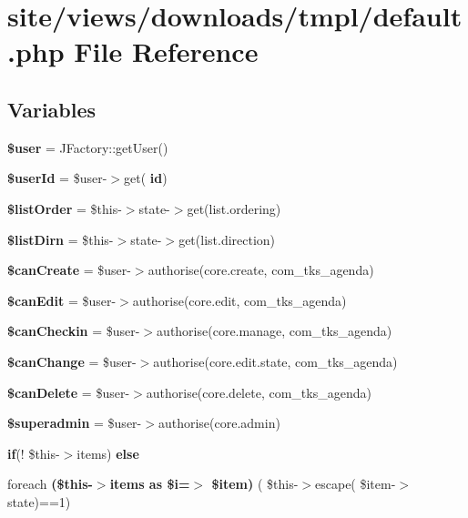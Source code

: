 \section{site/views/downloads/tmpl/default.php File Reference}
\label{site_2views_2downloads_2tmpl_2default_8php}
\subsection*{Variables}
\begin{DoxyCompactItemize}
\item 
\textbf{ \$user} = J\+Factory\+::get\+User()
\item 
\textbf{ \$user\+Id} = \$user-\/$>$get(\textquotesingle{}\textbf{ id}\textquotesingle{})
\item 
\textbf{ \$list\+Order} = \$this-\/$>$state-\/$>$get(\textquotesingle{}list.\+ordering\textquotesingle{})
\item 
\textbf{ \$list\+Dirn} = \$this-\/$>$state-\/$>$get(\textquotesingle{}list.\+direction\textquotesingle{})
\item 
\textbf{ \$can\+Create} = \$user-\/$>$authorise(\textquotesingle{}core.\+create\textquotesingle{}, \textquotesingle{}com\+\_\+tks\+\_\+agenda\textquotesingle{})
\item 
\textbf{ \$can\+Edit} = \$user-\/$>$authorise(\textquotesingle{}core.\+edit\textquotesingle{}, \textquotesingle{}com\+\_\+tks\+\_\+agenda\textquotesingle{})
\item 
\textbf{ \$can\+Checkin} = \$user-\/$>$authorise(\textquotesingle{}core.\+manage\textquotesingle{}, \textquotesingle{}com\+\_\+tks\+\_\+agenda\textquotesingle{})
\item 
\textbf{ \$can\+Change} = \$user-\/$>$authorise(\textquotesingle{}core.\+edit.\+state\textquotesingle{}, \textquotesingle{}com\+\_\+tks\+\_\+agenda\textquotesingle{})
\item 
\textbf{ \$can\+Delete} = \$user-\/$>$authorise(\textquotesingle{}core.\+delete\textquotesingle{}, \textquotesingle{}com\+\_\+tks\+\_\+agenda\textquotesingle{})
\item 
\textbf{ \$superadmin} = \$user-\/$>$authorise(\textquotesingle{}core.\+admin\textquotesingle{})
\item 
\textbf{ if}(! \$this-\/$>$items) \textbf{ else}
\item 
foreach \textbf{ (\$this-\/$>$items as \$i=$>$ \$item)} ( \$this-\/$>$escape( \$item-\/$>$state)==1)
\end{DoxyCompactItemize}


